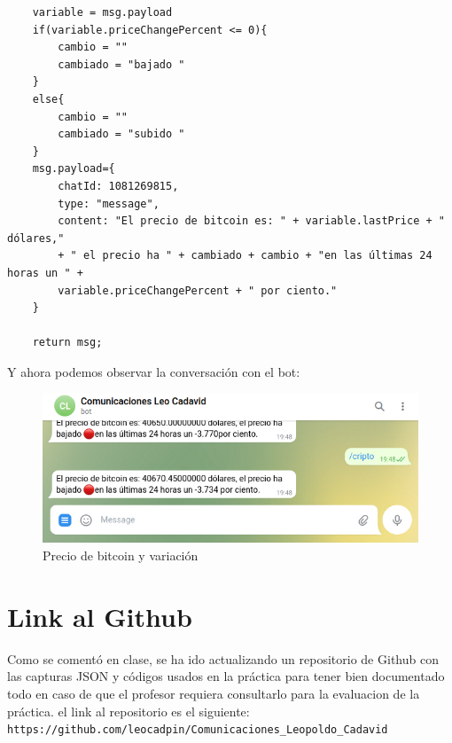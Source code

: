\documentclass[12pt]{article}
\begin{document}
\begin{verbatim}
    variable = msg.payload
    if(variable.priceChangePercent <= 0){
        cambio = ""
        cambiado = "bajado "
    }
    else{
        cambio = ""
        cambiado = "subido "
    }
    msg.payload={
        chatId: 1081269815,
        type: "message",
        content: "El precio de bitcoin es: " + variable.lastPrice + " dólares,"
        + " el precio ha " + cambiado + cambio + "en las últimas 24 horas un " +
        variable.priceChangePercent + " por ciento."
    }
    
    return msg;

\end{verbatim}    

Y ahora podemos observar la conversación con el bot:

\begin{figure}[H]
    \centering
    \includegraphics[scale=0.4]{comando_bitcoin.png}
    \caption{Precio de bitcoin y variación}
    \label{presiobtc}
\end{figure}

\section{Link al Github}
Como se comentó en clase, se ha ido actualizando un repositorio de Github con las capturas JSON y códigos usados en la práctica para tener bien documentado todo en caso de que el profesor
requiera consultarlo para la evaluacion de la práctica. el link al repositorio es el siguiente:\\

\verb|https://github.com/leocadpin/Comunicaciones_Leopoldo_Cadavid|
\end{document}

